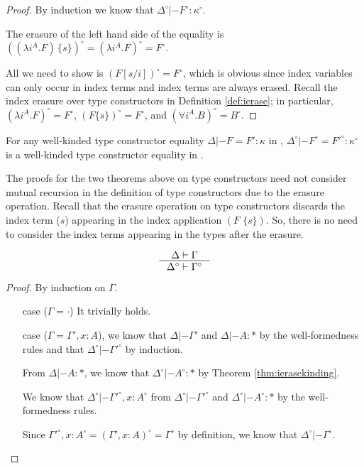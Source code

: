 \begin{proof}
By induction we know that $\Delta^\circ |- F^\circ : \kappa^\circ$.

The erasure of the left hand side of the equality is\\
$((\lambda i^A.F)\,\{s\})^\circ = (\lambda i^A.F)^\circ = F^\circ$.

All we need to show is $(F[s/i])^\circ = F^\circ$, which is obvious
since index variables can only occur in index terms and index terms
are always erased. Recall the index erasure over type constructors in
Definition \ref{def:ierase}; in particular, $(\lambda i^A.F)^\circ=F^\circ$,
$(F\{s\})^\circ=F^\circ$, and $(\forall i^A.B)^\circ=B^\circ$.
\end{proof}
\begin{remark}
For any well-kinded type constructor equality $\Delta |- F=F':\kappa$ in \Fi,
$\Delta^\circ|- F^\circ=F'^\circ:\kappa^\circ$ is
a well-kinded type constructor equality in \Fw.
\end{remark}


The proofs for the two theorems above on type constructors need not consider
mutual recursion in the definition of type constructors due to
the erasure operation. Recall that the erasure operation on type constructors
discards the index term ($s$) appearing in the index application $(F\;\{s\})$.
So, there is no need to consider the index terms appearing in the types after
the erasure.

\begin{theorem}
\label{thm:ierasetmctx}
\[ \inference{\Delta |- \Gamma}{\Delta^\circ |- \Gamma^\circ} \]
\end{theorem}
\begin{proof}
By induction on $\Gamma$.
\begin{itemize}
\item[case] ($\Gamma=\cdot$) It trivially holds.
\item[case] ($\Gamma = \Gamma',x:A$),
we know that  $\Delta |- \Gamma'$ and $\Delta |- A:*$
by the well-formedness rules
and that $\Delta^\circ |- \Gamma'^\circ$ by induction.

From $\Delta |- A:*$, we know that $\Delta^\circ |- A^\circ :*$
by Theorem \ref{thm:ierasekinding}.

We know that $\Delta^\circ |- \Gamma'^\circ,x:A^\circ$
from $\Delta^\circ |- \Gamma'^\circ$ and $\Delta^\circ |- A^\circ :*$
by the well-formedness rules.

Since $\Gamma'^\circ,x:A^\circ = (\Gamma',x:A)^\circ = \Gamma^\circ$
by definition, we know that $\Delta^\circ |- \Gamma^\circ$.
\end{itemize}\vspace*{-10pt}
\end{proof}

